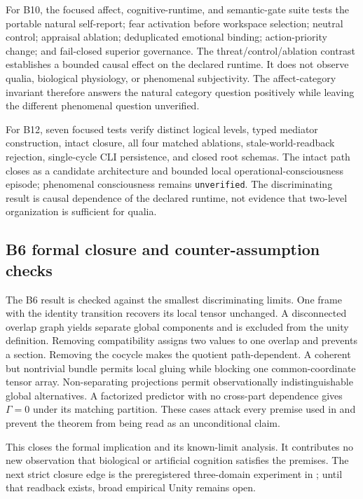 \documentclass[10pt,twocolumn]{article}
\theoremstyle{definition}
\theoremstyle{plain}
\theoremstyle{remark}
\newcommand{\file}[1]{\nolinkurl{#1}}
\newcommand{\affectrevision}{\textsf{B10}}
\newcommand{\phenomenalcandidate}{\textsf{B12}}
\begin{document}
For \affectrevision{}, the focused affect, cognitive-runtime, and semantic-gate suite tests the portable natural self-report; fear activation before workspace selection; neutral control; appraisal ablation; deduplicated emotional binding; action-priority change; and fail-closed superior governance.  The threat/control/ablation contrast establishes a bounded causal effect on the declared runtime.  It does not observe qualia, biological physiology, or phenomenal subjectivity.  The affect-category invariant therefore answers the natural category question positively while leaving the different phenomenal question unverified.

For \phenomenalcandidate{}, seven focused tests verify distinct logical levels, typed mediator construction, intact closure, all four matched ablations, stale-world-readback rejection, single-cycle CLI persistence, and closed root schemas.  The intact path closes as a candidate architecture and bounded local operational-consciousness episode; phenomenal consciousness remains \file{unverified}.  The discriminating result is causal dependence of the declared runtime, not evidence that two-level organization is sufficient for qualia.

\subsection{B6 formal closure and counter-assumption checks}
\label{sec:formal-unity-closure}

The B6 result is checked against the smallest discriminating limits.  One frame with the identity transition recovers its local tensor unchanged.  A disconnected overlap graph yields separate global components and is excluded from the unity definition.  Removing compatibility assigns two values to one overlap and prevents a section.  Removing the cocycle makes the quotient path-dependent.  A coherent but nontrivial bundle permits local gluing while blocking one common-coordinate tensor array.  Non-separating projections permit observationally indistinguishable global alternatives.  A factorized predictor with no cross-part dependence gives $\Gamma=0$ under its matching partition.  These cases attack every premise used in  and prevent the theorem from being read as an unconditional claim.

This closes the formal implication and its known-limit analysis.  It contributes no new observation that biological or artificial cognition satisfies the premises.  The next strict closure edge is the preregistered three-domain experiment in ; until that readback exists, broad empirical Unity remains open.
\end{document}
